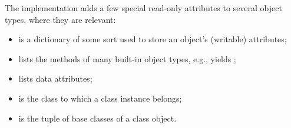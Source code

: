 The implementation adds a few special read-only attributes to several
object types, where they are relevant:

\begin{itemize}

\item
{} is a dictionary of some sort used to store an
object's (writable) attributes;

\item
{} lists the methods of many built-in object types,
e.g.,  yields
;

\item
{} lists data attributes;

\item
{} is the class to which a class instance belongs;

\item
{} is the tuple of base classes of a class object.

\end{itemize}
